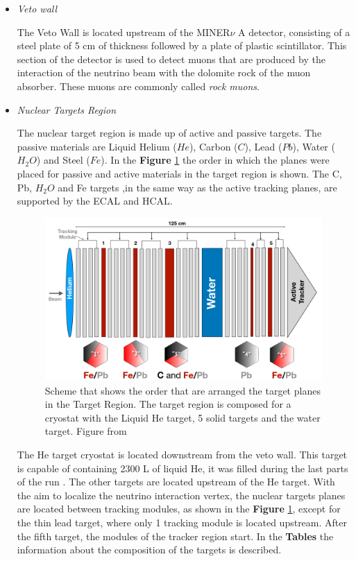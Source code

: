 \begin{itemize}
    \item \textit{Veto wall}

    The Veto Wall is located upstream of the MINER$\nu$ A detector, consisting of a steel plate of 5 cm of thickness followed by a plate of plastic scintillator. This section of the detector is used to detect muons that are produced by the interaction of the neutrino beam with the dolomite rock of the muon absorber. These muons are commonly called \textit{rock muons}.

    \item \textit{Nuclear Targets Region}

    The nuclear target region is made up of active and passive targets. The passive materials are Liquid Helium ($He$), Carbon ($C$), Lead ($Pb$), Water ($H_2O$) and Steel ($Fe$). In the \textbf{Figure} \ref{fig:MnvExp:MnvDetector:TargetRegion} the order in which the planes were placed for passive and active materials in the target region is shown. The C, Pb, $H_2O$ and Fe targets ,in the same way as the active tracking planes, are supported by the ECAL and HCAL.
    
    \begin{figure}[!htb]
    \centering
    \includegraphics[scale=0.35]{Figures/Chapter2/TargetRegion1.png}

        \caption{Scheme that shows the order that are arranged the target planes in the Target Region. The target region is composed for a cryostat with the Liquid He target, 5 solid targets and the water target. Figure from \cite{MarvinThesis}} 
    \label{fig:MnvExp:MnvDetector:TargetRegion}
    \end{figure}
    
    The He target cryostat is located downstream from the veto wall. This target is capable of containing 2300 L of liquid He, it was filled during the last parts of the run \cite{MINERvA}. The other targets are located upstream of the He target. With the aim to localize the neutrino interaction vertex, the nuclear targets planes are located between tracking modules, as shown in the \textbf{Figure} \ref{fig:MnvExp:MnvDetector:TargetRegion}, except for the thin lead target, where only 1 tracking module is located upstream. After the fifth target, the modules of the tracker region start. In the \textbf{Tables} the information about the composition of the targets is described. 


\end{itemize}
